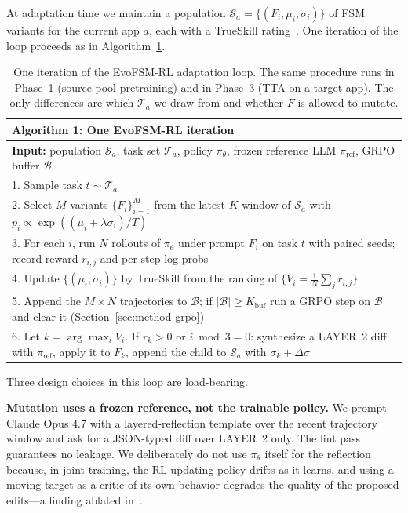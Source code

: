 At adaptation time we maintain a population $\mathcal{S}_a = \{(F_i, \mu_i, \sigma_i)\}$ of FSM variants for the current app $a$, each with a TrueSkill rating~\citep{herbrich2007trueskill}. One iteration of the loop proceeds as in Algorithm~\ref{alg:evofsmrl}.

\begin{table}[t]
\small
\centering
\begin{tabular}{p{}}
\hline
\textbf{Algorithm 1: One EvoFSM-RL iteration} \\
\hline
\textbf{Input:} population $\mathcal{S}_a$, task set $\mathcal{T}_a$, policy $\pi_\theta$, frozen reference LLM $\pi_{\text{ref}}$, GRPO buffer $\mathcal{B}$ \\
\hline
1. Sample task $t \sim \mathcal{T}_a$ \\
2. Select $M$ variants $\{F_i\}_{i=1}^M$ from the latest-$K$ window of $\mathcal{S}_a$ with $p_i \propto \exp((\mu_i + \lambda\sigma_i)/T)$ \\
3. For each $i$, run $N$ rollouts of $\pi_\theta$ under prompt $F_i$ on task $t$ with paired seeds; record reward $r_{i,j}$ and per-step log-probs \\
4. Update $\{(\mu_i, \sigma_i)\}$ by TrueSkill from the ranking of $\{V_i = \tfrac{1}{N}\sum_j r_{i,j}\}$ \\
5. Append the $M{\times}N$ trajectories to $\mathcal{B}$; if $|\mathcal{B}| \ge K_{\text{buf}}$ run a GRPO step on $\mathcal{B}$ and clear it (Section~\ref{sec:method-grpo}) \\
6. Let $k = \arg\max_i V_i$. If $r_k > 0$ or $i \bmod 3 = 0$: synthesize a LAYER~2 diff with $\pi_{\text{ref}}$, apply it to $F_k$, append the child to $\mathcal{S}_a$ with $\sigma_k + \Delta\sigma$ \\
\hline
\end{tabular}
\caption{One iteration of the EvoFSM-RL adaptation loop. The same procedure runs in Phase~1 (source-pool pretraining) and in Phase~3 (TTA on a target app). The only differences are which $\mathcal{T}_a$ we draw from and whether $F$ is allowed to mutate.}
\label{alg:evofsmrl}
\end{table}

Three design choices in this loop are load-bearing.

\textbf{Mutation uses a frozen reference, not the trainable policy.} We prompt Claude Opus 4.7 with a layered-reflection template over the recent trajectory window and ask for a JSON-typed diff over LAYER~2 only. The lint pass guarantees no leakage. We deliberately do not use $\pi_\theta$ itself for the reflection because, in joint training, the RL-updating policy drifts as it learns, and using a moving target as a critic of its own behavior degrades the quality of the proposed edits---a finding ablated in~\citet{zhang2026espl}.

